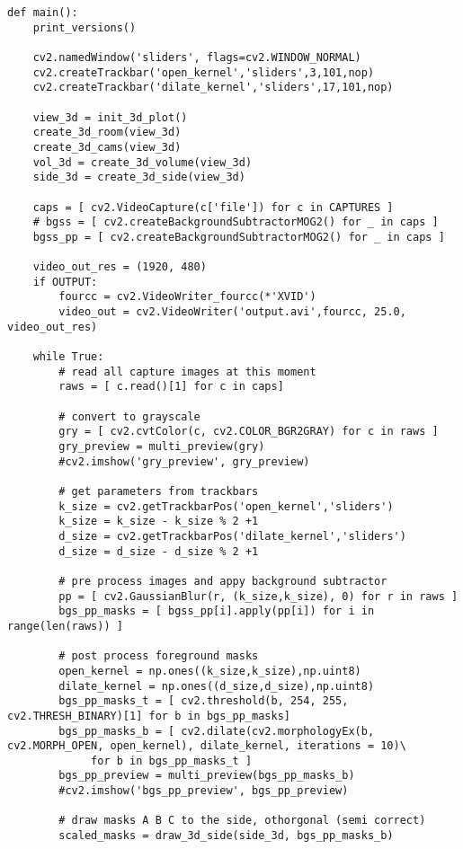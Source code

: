 \begin{lstlisting}[caption={Main function of the volume intersection program}, label={lst:app:volmain}]
def main():
    print_versions()

    cv2.namedWindow('sliders', flags=cv2.WINDOW_NORMAL)
    cv2.createTrackbar('open_kernel','sliders',3,101,nop)
    cv2.createTrackbar('dilate_kernel','sliders',17,101,nop)

    view_3d = init_3d_plot()
    create_3d_room(view_3d)
    create_3d_cams(view_3d)
    vol_3d = create_3d_volume(view_3d)
    side_3d = create_3d_side(view_3d)

    caps = [ cv2.VideoCapture(c['file']) for c in CAPTURES ]
    # bgss = [ cv2.createBackgroundSubtractorMOG2() for _ in caps ]
    bgss_pp = [ cv2.createBackgroundSubtractorMOG2() for _ in caps ]

    video_out_res = (1920, 480)
    if OUTPUT:
        fourcc = cv2.VideoWriter_fourcc(*'XVID')
        video_out = cv2.VideoWriter('output.avi',fourcc, 25.0, video_out_res)

    while True:
        # read all capture images at this moment
        raws = [ c.read()[1] for c in caps]

        # convert to grayscale
        gry = [ cv2.cvtColor(c, cv2.COLOR_BGR2GRAY) for c in raws ]
        gry_preview = multi_preview(gry)
        #cv2.imshow('gry_preview', gry_preview)

        # get parameters from trackbars
        k_size = cv2.getTrackbarPos('open_kernel','sliders')
        k_size = k_size - k_size % 2 +1
        d_size = cv2.getTrackbarPos('dilate_kernel','sliders')
        d_size = d_size - d_size % 2 +1

        # pre process images and appy background subtractor
        pp = [ cv2.GaussianBlur(r, (k_size,k_size), 0) for r in raws ]
        bgs_pp_masks = [ bgss_pp[i].apply(pp[i]) for i in range(len(raws)) ]

        # post process foreground masks
        open_kernel = np.ones((k_size,k_size),np.uint8)
        dilate_kernel = np.ones((d_size,d_size),np.uint8)
        bgs_pp_masks_t = [ cv2.threshold(b, 254, 255, cv2.THRESH_BINARY)[1] for b in bgs_pp_masks]
        bgs_pp_masks_b = [ cv2.dilate(cv2.morphologyEx(b, cv2.MORPH_OPEN, open_kernel), dilate_kernel, iterations = 10)\
             for b in bgs_pp_masks_t ]
        bgs_pp_preview = multi_preview(bgs_pp_masks_b)
        #cv2.imshow('bgs_pp_preview', bgs_pp_preview)

        # draw masks A B C to the side, othorgonal (semi correct)
        scaled_masks = draw_3d_side(side_3d, bgs_pp_masks_b)


\end{lstlisting}
